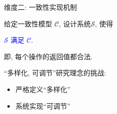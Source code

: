 % 
\begin{frame}{维度二: 一致性实现机制}
  \begin{center}
	给定一致性模型 $\mathcal{C}$, 设计系统$\mathcal{S}$, 使得

	\pause
	\vspace{0.30cm}
	\textcolor{blue}{$\mathcal{S}$ 满足 $\mathcal{C}$}.

	即, 每个操作的返回值都合法.
  \end{center}


  \pause
  \vspace{0.50cm}

  \begin{center}
	``多样化, 可调节''研究理念的挑战:
	\vspace{8pt}
	\begin{itemize}
	  \centering
	  \item 严格定义``多样化''
	  \item 系统实现``可调节''
	\end{itemize}
  \end{center}
\end{frame}
